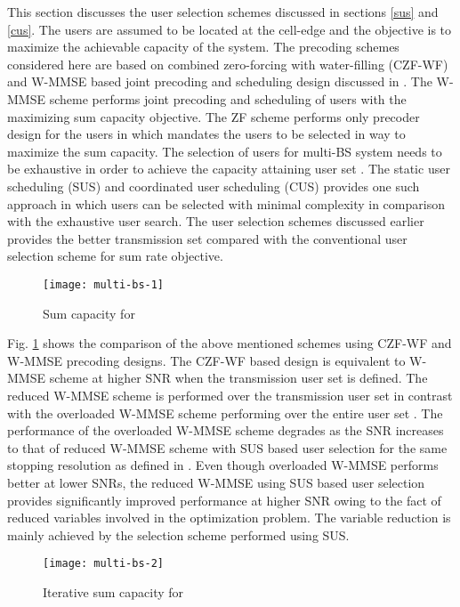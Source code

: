 ﻿
This section discusses the user selection schemes discussed in sections \ref{sus} and \ref{cus}. The users are assumed to be located at the cell-edge and the objective is to maximize the achievable capacity of the system. The precoding schemes considered here are based on combined zero-forcing with water-filling (CZF-WF) and W-MMSE based joint precoding and scheduling design discussed in \cite{wmmse_shi}. The W-MMSE scheme performs joint precoding and scheduling of users with the maximizing sum capacity objective. The ZF scheme performs only precoder design for the users in  which mandates the users to be selected in way to maximize the sum capacity. The selection of users for multi-BS system needs to be exhaustive in order to achieve the capacity attaining user set . The static user scheduling (SUS) and coordinated user scheduling (CUS) provides one such approach in which users can be selected with minimal complexity in comparison with the exhaustive user search. The user selection schemes discussed earlier provides the better transmission set compared with the conventional user selection scheme for sum rate objective.
\begin{figure}
\centering
\texttt{[image: multi-bs-1]}
\caption[short]{Sum capacity for }
\label{multi-bs-f1}
\end{figure}

Fig. \ref{multi-bs-f1} shows the comparison of the above mentioned schemes using CZF-WF and W-MMSE precoding designs. The CZF-WF based design is equivalent to W-MMSE scheme at higher SNR when the transmission user set  is defined. The reduced W-MMSE scheme is performed over the transmission user set  in contrast with the overloaded W-MMSE scheme performing over the entire user set . The performance of the overloaded W-MMSE scheme degrades as the SNR increases to that of reduced W-MMSE scheme with SUS based user selection for the same stopping resolution \me{\epsilon} as defined in \cite{wmmse_shi}. Even though overloaded W-MMSE performs better at lower SNRs, the reduced W-MMSE using SUS based user selection provides significantly improved performance at higher SNR owing to the fact of reduced variables involved in the optimization problem. The variable reduction is mainly achieved by the selection scheme performed using SUS.
\begin{figure}
\centering
\texttt{[image: multi-bs-2]}
\caption[short]{Iterative sum capacity for }
\label{multi-bs-f2}
\end{figure}

